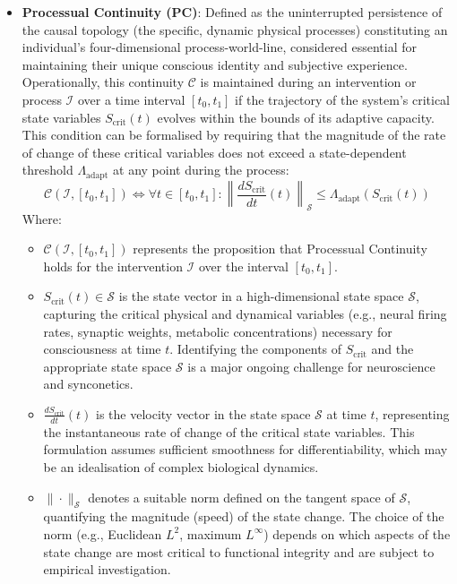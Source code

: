 \documentclass[10pt]{article}
\begin{document}
\begin{sloppypar}
\begin{itemize}
    \item \textbf{Processual Continuity (PC)}: Defined as the uninterrupted persistence of the causal topology (the specific, dynamic physical processes) constituting an individual’s four-dimensional process-world-line, considered essential for maintaining their unique conscious identity and subjective experience. Operationally, this continuity \( \mathcal{C} \) is maintained during an intervention or process \( \mathcal{I} \) over a time interval \( [t_0, t_1] \) if the trajectory of the system’s critical state variables \( S_{\text{crit}}(t) \) evolves within the bounds of its adaptive capacity. This condition can be formalised by requiring that the magnitude of the rate of change of these critical variables does not exceed a state-dependent threshold \( \Lambda_{\text{adapt}} \) at any point during the process:
          \begin{equation}
            \mathcal{C}(\mathcal{I}, [t_0, t_1]) \iff \forall t \in [t_0, t_1] : \left\| \frac{dS_{\text{crit}}}{dt}(t) \right\|_{\mathcal{S}} \le \Lambda_{\text{adapt}}(S_{\text{crit}}(t))
            \label{eq:continuity}
          \end{equation}
          Where:
          \begin{itemize}
            \item \( \mathcal{C}(\mathcal{I}, [t_0, t_1]) \) represents the proposition that Processual Continuity holds for the intervention \( \mathcal{I} \) over the interval \( [t_0, t_1] \).
            \item \( S_{\text{crit}}(t) \in \mathcal{S} \) is the state vector in a high-dimensional state space \( \mathcal{S} \), capturing the critical physical and dynamical variables (e.g., neural firing rates, synaptic weights, metabolic concentrations) necessary for consciousness at time \( t \). Identifying the components of \( S_{\text{crit}} \) and the appropriate state space \( \mathcal{S} \) is a major ongoing challenge for neuroscience and synconetics.
            \item \( \frac{dS_{\text{crit}}}{dt}(t) \) is the velocity vector in the state space \( \mathcal{S} \) at time \( t \), representing the instantaneous rate of change of the critical state variables. This formulation assumes sufficient smoothness for differentiability, which may be an idealisation of complex biological dynamics.
            \item \( \| \cdot \|_{\mathcal{S}} \) denotes a suitable norm defined on the tangent space of \( \mathcal{S} \), quantifying the magnitude (speed) of the state change. The choice of the norm (e.g., Euclidean \( L^2 \), maximum \( L^\infty \)) depends on which aspects of the state change are most critical to functional integrity and are subject to empirical investigation.

\end{itemize}
\end{itemize}
\end{sloppypar}
\end{document}
